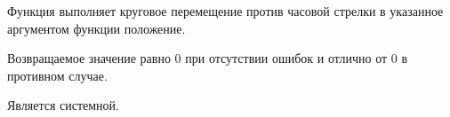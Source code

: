 Функция выполняет круговое перемещение против часовой стрелки в указанное аргументом функции положение. \killoverfullbefore

Возвращаемое значение равно 0 при отсутствии ошибок и отлично от 0 в противном случае. \killoverfullbefore

Является системной.
\begin{comment}
\subsubsection{\DbgSecSt{\StPart}{moveTrigger}}
\index{Программный интерфейс ПЛК!Управление движением!Функция moveTrigger}
\label{sec:moveTrigger}

\begin{pHeader}
    Синтаксис:      & \RightHandText{int moveTrigger(const Pos \&pos, const Pos \&trigger);}\\
    Аргумент(ы):    & \RightHandText {const \myreftosec{Pos} \&pos ~-- данные перемещения} \\  
    & \RightHandText{const \myreftosec{Pos} \&trigger ~-- данные } \\
    Файл объявления:             & \RightHandText{sys/sys.h} \\      
\end{pHeader}

Функция выполняет  . \killoverfullbefore

Возвращаемое значение равно 0 при отсутствии ошибок и отлично от 0 в противном случае. \killoverfullbefore

Является системной.
\subsubsection{\DbgSecSt{\StPart}{moveVel}}
\index{Программный интерфейс ПЛК!Управление движением!Функция moveTrigger}
\label{sec:moveVel}

\begin{pHeader}
    Синтаксис:      & \RightHandText{int moveVel(const Pos \&pos, const Pos \&vel);}\\
    Аргумент(ы):    & \RightHandText {const \myreftosec{Pos} \&pos ~-- данные перемещения} \\  
    & \RightHandText{const \myreftosec{Pos} \&vel ~-- данные } \\
    Файл объявления:             & \RightHandText{sys/sys.h} \\      
\end{pHeader}

Функция выполняет  . \killoverfullbefore

Возвращаемое значение равно 0 при отсутствии ошибок и отлично от 0 в противном случае. \killoverfullbefore

Является системной.
\end{comment}
